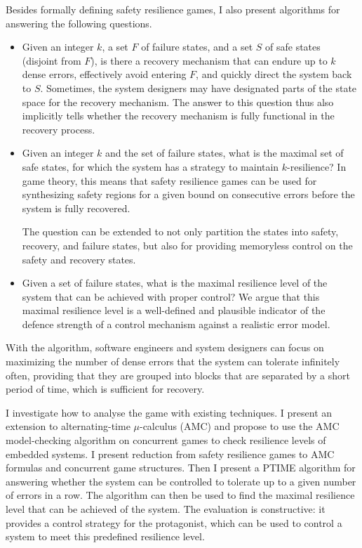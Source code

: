 Besides formally defining safety resilience games, I also present algorithms for answering the following questions.  
\begin{itemize} 
\item Given an integer $k$, a set $F$ of failure states, and 
  a set $S$ of safe states (disjoint from $F$), is there a recovery mechanism that 
  can endure up to $k$ dense errors, 
  effectively avoid entering $F$, and quickly direct the system back to $S$.  
  Sometimes, the system designers may have designated parts of the state space 
  for the recovery mechanism.  
  The answer to this question thus also implicitly tells 
  whether the recovery 
  mechanism is fully functional in the recovery process. 
\item Given an integer $k$ and the set of failure states, 
  what is the maximal set of safe states, 
  for which the system has a strategy to maintain $k$-resilience?
  In game theory, this means that 
  safety resilience games can be used for synthesizing safety regions 
  for a given bound on consecutive errors before the system is fully recovered.  
  
The question can be extended to not only partition the states into safety, recovery, and failure states, but also for providing memoryless control on the safety and recovery states.
  
\item Given a set of failure states, what is the maximal resilience level of the system that can be achieved with proper control?  
  We argue that this maximal resilience level is a well-defined and plausible indicator of the defence strength of a control mechanism against a realistic error model. 
\end{itemize} 
With the algorithm, software engineers and system designers can focus on maximizing the number of dense errors that the system can tolerate infinitely often, providing that they are grouped into blocks that are separated by a short period of time, which is sufficient for recovery.

I investigate how to analyse the game with existing techniques. 
I present an extension to alternating-time $\mu$-calculus (AMC) and propose to use the AMC model-checking algorithm on concurrent games to check resilience levels of embedded systems. 
I present reduction from safety resilience games to AMC formulas and concurrent game structures.  
Then I present a PTIME algorithm for answering whether the system can be controlled to tolerate up to a given number of errors in a row.
The algorithm can then be used to find the maximal resilience level that can be achieved of the system. 
The evaluation is constructive: it provides a control strategy for the protagonist, which can be used to control a system to meet this predefined resilience level.


  



